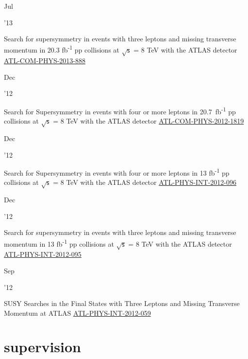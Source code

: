 \documentclass[]{cv} %
\begin{document}
\begin{entrylist}
\entry
{\parbox[t]{\parboxWidthOne}{Jul}\parbox[t]{\parboxWidthTwo}{\hfill '13}}
{Search for supersymmetry in events with three leptons and missing transverse momentum in 20.3 fb\textsuperscript{-1} pp
collisions at $\sqrt{\mathsf{s}}$ = 8 TeV with the ATLAS detector}
{\href{https://cds.cern.ch/record/1558985}{ATL-COM-PHYS-2013-888}}
{\vspace*{\spacingPubs}}

\entry
{\parbox[t]{\parboxWidthOne}{Dec}\parbox[t]{\parboxWidthTwo}{\hfill '12}}
{Search for Supersymmetry in events with four or more leptons in 20.7~fb\textsuperscript{-1} pp collisions at $\sqrt{\mathsf{s}}$
= 8 TeV with the ATLAS detector}
{\href{https://cds.cern.ch/record/1501709}{ATL-COM-PHYS-2012-1819}}
{\vspace*{\spacingPubs}}

\entry
{\parbox[t]{\parboxWidthOne}{Dec}\parbox[t]{\parboxWidthTwo}{\hfill '12}}
{Search for Supersymmetry in events with four or more leptons in 13 fb\textsuperscript{-1} pp collisions at $\sqrt{\mathsf{s}}$ =
8 TeV with the ATLAS detector}
{\href{https://cds.cern.ch/record/1498627}{ATL-PHYS-INT-2012-096}}
{\vspace*{\spacingPubs}}

\entry
{\parbox[t]{\parboxWidthOne}{Dec}\parbox[t]{\parboxWidthTwo}{\hfill '12}}
{Search for supersymmetry in events with three leptons and missing transverse momentum in 13 fb\textsuperscript{-1} pp collisions
at $\sqrt{\mathsf{s}}$ = 8 TeV with the ATLAS detector}
{\href{https://cds.cern.ch/record/1498390}{ATL-PHYS-INT-2012-095}}
{\vspace*{\spacingPubs}}

\entry
{\parbox[t]{\parboxWidthOne}{Sep}\parbox[t]{\parboxWidthTwo}{\hfill '12}}
{SUSY Searches in the Final States with Three Leptons and Missing Transverse Momentum at ATLAS}
{\href{https://cds.cern.ch/record/1482141}{ATL-PHYS-INT-2012-059}}
{\vspace*{\spacingPubs}}

\end{entrylist}
\fi

\section{supervision}
\end{document}
